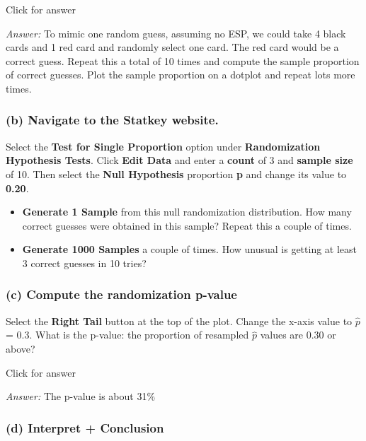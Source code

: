 \documentclass[
]{book}
\providecommand{\tightlist}{%
  \setlength{\itemsep}{0pt}\setlength{\parskip}{0pt}}
\begin{document}
Click for answer

\emph{Answer:} To mimic one random guess, assuming no ESP, we could take 4 black cards and 1 red card and randomly select one card. The red card would be a correct guess. Repeat this a total of 10 times and compute the sample proportion of correct guesses. Plot the sample proportion on a dotplot and repeat lots more times.

\hypertarget{b-navigate-to-the-statkey-website.}{%
\subsubsection{(b) Navigate to the Statkey website.}\label{b-navigate-to-the-statkey-website.}}

Select the \textbf{Test for Single Proportion} option under \textbf{Randomization Hypothesis Tests}. Click \textbf{Edit Data} and enter a \textbf{count} of 3 and \textbf{sample size} of 10. Then select the \textbf{Null Hypothesis} proportion \textbf{p} and change its value to \textbf{0.20}.

\begin{itemize}
\tightlist
\item
  \textbf{Generate 1 Sample} from this null randomization distribution. How many correct guesses were obtained in this sample? Repeat this a couple of times.
\item
  \textbf{Generate 1000 Samples} a couple of times. How unusual is getting at least 3 correct guesses in 10 tries?
\end{itemize}

\vspace*{.5in}

\hypertarget{c-compute-the-randomization-p-value}{%
\subsubsection{(c) Compute the randomization p-value}\label{c-compute-the-randomization-p-value}}

Select the \textbf{Right Tail} button at the top of the plot. Change the x-axis value to \(\hat{p}\) = 0.3. What is the p-value: the proportion of resampled \(\hat{p}\) values are 0.30 or above?

Click for answer

\emph{Answer:} The p-value is about 31\%

\hypertarget{d-interpret-conclusion}{%
\subsubsection{(d) Interpret + Conclusion}\label{d-interpret-conclusion}}
\end{document}
